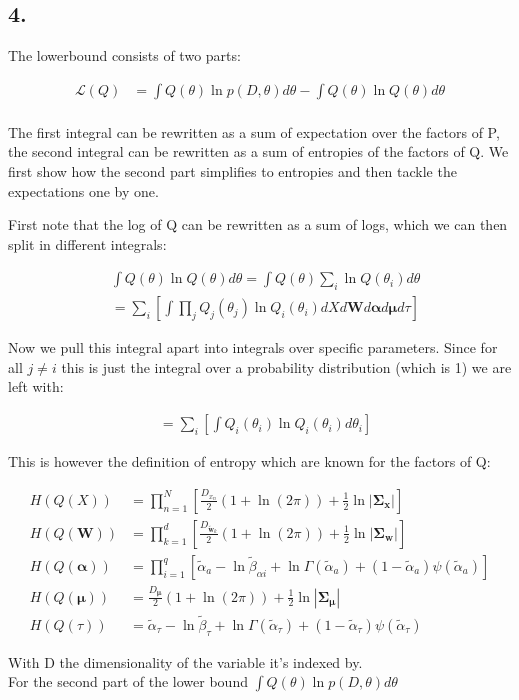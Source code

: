 \documentclass{article}
\def\*#1{\boldsymbol{#1}}
\begin{document}
\subsection*{4.}

The lowerbound consists of two parts:

\begin{align*}
\mathcal{L}(Q) &= \int Q(\theta) \ln p(D, \theta) d\theta - \int Q(\theta) \ln Q(\theta) d\theta \\
\end{align*}

The first integral can be rewritten as a sum of expectation over the factors of P, the second integral can be rewritten as a sum of entropies of the factors of Q. We first show how the second part simplifies to entropies and then tackle the expectations one by one.

First note that the log of Q can be rewritten as a sum of logs, which we can then split in different integrals:

\begin{align*}
& \int Q(\theta) \ln Q(\theta) d\theta = \int Q(\theta) \sum_i \ln Q(\theta_i) d\theta\\
&= \sum_i \left[ \int \prod_j Q_j(\theta_j) \ln Q_i(\theta_i) dX d\*W d\*\alpha d\*\mu d\tau \right]
\end{align*}

Now we pull this integral apart into integrals over specific parameters. Since for all $j \neq i$ this is just the integral over a probability distribution (which is 1) we are left with:

\begin{align*}
&= \sum_i \left[ \int Q_i(\theta_i) \ln Q_i(\theta_i) d\theta_i \right]
\end{align*}

This is however the definition of entropy which are known for the factors of Q:

\begin{align*}
H(Q(X)) &= \prod_{n=1}^N \left [\frac{D_{x_n}}{2}  (1 + \ln (2\pi)) + \frac{1}{2} \ln |\*\Sigma_{\*x} | \right ] \\
H(Q(\*W)) &= \prod_{k=1}^d \left [ \frac{D_{\tilde{\*w}_k} }{2} (1 + \ln (2\pi)) + \frac{1}{2} \ln |\*\Sigma_{\*w} | \right ] \\
H(Q(\*\alpha)) &= \prod_{i = 1}^q \left [ \tilde{\alpha}_a - \ln \tilde{\beta}_{\alpha i} + \ln \Gamma(\tilde{\alpha}_a) + (1 - \tilde{\alpha}_a)\psi(\tilde{\alpha}_a) \right ]\\
H(Q(\*\mu)) &= \frac{D_{\*\mu}}{2}  (1 + \ln (2\pi)) + \frac{1}{2} \ln |\*\Sigma_{\*\mu} | \\
H(Q(\tau)) &= \tilde{\alpha}_\tau - \ln \tilde{\beta}_{\tau} + \ln \Gamma(\tilde{\alpha}_\tau) + (1 - \tilde{\alpha}_\tau)\psi(\tilde{\alpha}_\tau)
\end{align*}

With D the dimensionality of the variable it's indexed by.\\

For the second part of the lower bound $\int Q(\theta) \ln p(D, \theta) d\theta$
\end{document}
